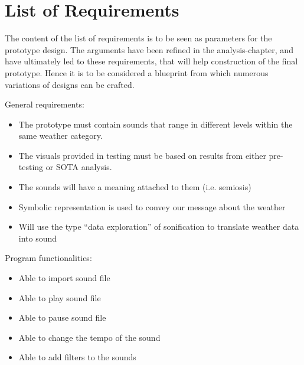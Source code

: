 
\section{List of Requirements} %
\label{sec:list_of_requirements}

The content of the list of requirements is to be seen as parameters for the prototype design. 
The arguments have been refined in the analysis-chapter, and have ultimately
led to these requirements, that will help construction of the final prototype. 
Hence it is to be considered a blueprint from which numerous variations of designs can be crafted.

General requirements:
\begin{itemize}
    \item The prototype must contain sounds that range in different levels within the same weather category.
    \item The visuals provided in testing must be based on results from either pre-testing or SOTA analysis.
    \item The sounds will have a meaning attached to them (i.e. semiosis)
    \item Symbolic representation is used to convey our message about the weather
    \item Will use the type “data exploration” of sonification to translate weather data into sound
\end{itemize}

Program functionalities:
\begin{itemize}
    \item Able to import sound file
    \item Able to play sound file
    \item Able to pause sound file
    \item Able to change the tempo of the sound
    \item Able to add filters to the sounds
\end{itemize}

